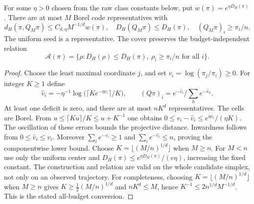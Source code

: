 \begin{lemma}\label{lem:filtercover}
For some $\eta>0$ chosen from the raw class constants below, put $w(\pi)=e^{\eta D_H(\pi)}$. There are at most $M$ Borel code representatives with
\[
 d_H(\pi,Q_M\pi)\le C_{d,\eta}M^{-1/d}w(\pi),\quad
 D_H(Q_M\pi)\le D_H(\pi),\quad (Q_M\pi)_i\ge\pi_i/n.
\]
The uniform seed is a representative. The cover preserves the budget-independent relation
\begin{equation}\label{eq:filterrelation}
 \mathcal A(\pi)=\{\rho:D_H(\rho)\le D_H(\pi),\ \rho_i\ge\pi_i/n\text{ for all }i\}.
\end{equation}
\end{lemma}
\begin{proof}
Choose the least maximal coordinate $j$, and set $v_i=\log(\pi_j/\pi_i)\ge0$. For integer $K\ge1$ define
\[
 \widehat v_i=-\eta^{-1}\log\bigl(\lceil Ke^{-\eta v_i}\rceil/K\bigr),
 \qquad (Q\pi)_i=e^{-\widehat v_i}/\sum_h e^{-\widehat v_h}.
\]
At least one deficit is zero, and there are at most $nK^d$ representatives. The cells are Borel. From $u\le\lceil Ku\rceil/K\le u+K^{-1}$ one obtains
$0\le v_i-\widehat v_i\le e^{\eta v_i}/(\eta K)$.
The oscillation of these errors bounds the projective distance. Inwardness follows from $0\le\widehat v_i\le v_i$. Moreover $\sum_i e^{-v_i}\ge1$ and $\sum_i e^{-\widehat v_i}\le n$, proving the componentwise lower bound. Choose $K=\lfloor(M/n)^{1/d}\rfloor$ when $M\ge n$. For $M<n$ use only the uniform center and $D_H(\pi)\le e^{\eta D_H(\pi)}/(e\eta)$, increasing the fixed constant. The construction and relation are valid on the whole candidate simplex, not only on an observed trajectory.
For completeness, choosing $K=\lfloor(M/n)^{1/d}\rfloor$ when $M\ge n$ gives $K\ge\tfrac12(M/n)^{1/d}$ and $nK^d\le M$, hence $K^{-1}\le2n^{1/d}M^{-1/d}$. This is the stated all-budget conversion.
\end{proof}

